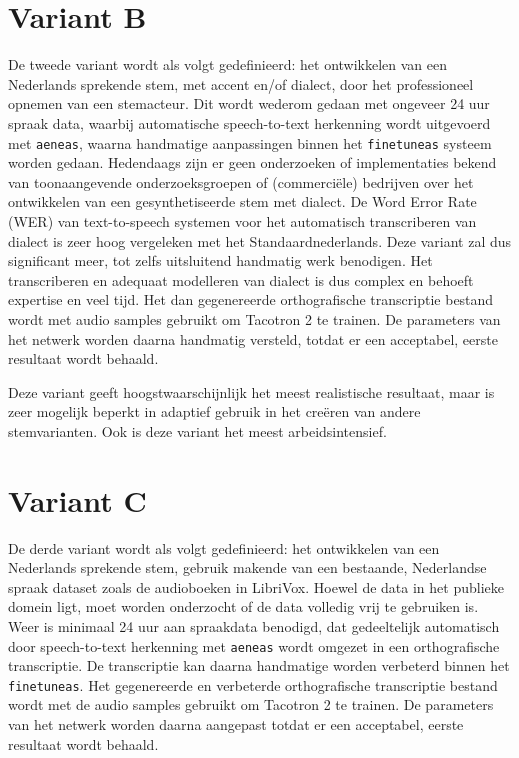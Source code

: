 \section{Variant B}
De tweede variant wordt als volgt gedefinieerd: het ontwikkelen van een Nederlands sprekende stem, met accent en/of dialect, door het professioneel opnemen van een stemacteur. Dit wordt wederom gedaan met ongeveer 24 uur spraak data, waarbij automatische speech-to-text herkenning wordt uitgevoerd met \texttt{aeneas}, waarna handmatige aanpassingen binnen het \texttt{finetuneas} systeem worden gedaan. Hedendaags zijn er geen onderzoeken of implementaties bekend van toonaangevende onderzoeksgroepen of (commerciële) bedrijven over het ontwikkelen van een gesynthetiseerde stem met dialect. De Word Error Rate (WER) van text-to-speech systemen voor het automatisch transcriberen van dialect is zeer hoog vergeleken met het Standaardnederlands. Deze variant zal dus significant meer, tot zelfs uitsluitend handmatig werk benodigen. Het transcriberen en adequaat modelleren van dialect is dus complex en behoeft expertise en veel tijd. Het dan gegenereerde orthografische transcriptie bestand wordt met audio samples gebruikt om Tacotron 2 te trainen. De parameters van het netwerk worden daarna handmatig versteld, totdat er een acceptabel, eerste resultaat wordt behaald.

Deze variant geeft hoogstwaarschijnlijk het meest realistische resultaat, maar is zeer mogelijk beperkt in adaptief gebruik in het creëren van andere stemvarianten. Ook is deze variant het meest arbeidsintensief.

\section{Variant C}
De derde variant wordt als volgt gedefinieerd: het ontwikkelen van een Nederlands sprekende stem, gebruik makende van een bestaande, Nederlandse spraak dataset zoals de audioboeken in LibriVox. Hoewel de data in het publieke domein ligt, moet worden onderzocht of de data volledig vrij te gebruiken is. Weer is minimaal 24 uur aan spraakdata benodigd, dat gedeeltelijk automatisch door speech-to-text herkenning met \texttt{aeneas} wordt omgezet in een orthografische transcriptie. De transcriptie kan daarna handmatige worden verbeterd binnen het \texttt{finetuneas}. Het gegenereerde en verbeterde orthografische transcriptie bestand wordt met de audio samples gebruikt om Tacotron 2 te trainen. De parameters van het netwerk worden daarna aangepast totdat er een acceptabel, eerste resultaat wordt behaald.

